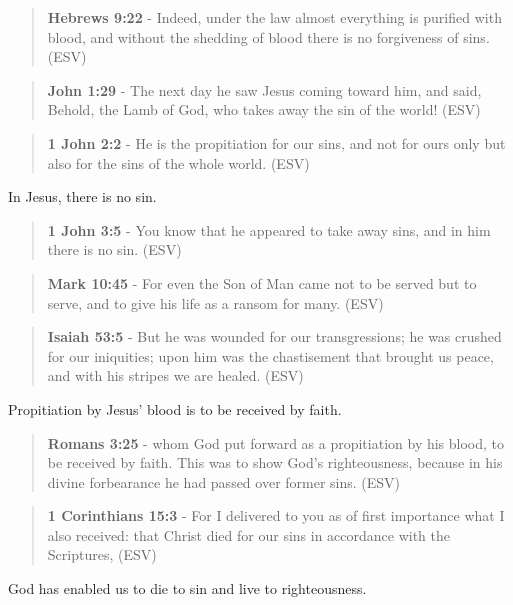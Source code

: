 \documentclass[11pt]{article}
\begin{document}
\begin{quote}
\textbf{Hebrews 9:22} - Indeed, under the law almost everything is purified with blood, and without the shedding of blood there is no forgiveness of sins.  (ESV)
\end{quote}

\begin{quote}
\textbf{John 1:29} - The next day he saw Jesus coming toward him, and said, Behold, the Lamb of God, who takes away the sin of the world!  (ESV)
\end{quote}

\begin{quote}
\textbf{1 John 2:2} - He is the propitiation for our sins, and not for ours only but also for the sins of the whole world.  (ESV)
\end{quote}

In Jesus, there is no sin.

\begin{quote}
\textbf{1 John 3:5} - You know that he appeared to take away sins, and in him there is no sin.  (ESV)
\end{quote}

\begin{quote}
\textbf{Mark 10:45} -  For even the Son of Man came not to be served but to serve, and to give his life as a ransom for many.  (ESV)
\end{quote}

\begin{quote}
\textbf{Isaiah 53:5} -  But he was wounded for our transgressions; he was crushed for our iniquities; upon him was the chastisement that brought us peace, and with his stripes we are healed.  (ESV)
\end{quote}

Propitiation by Jesus' blood is to be received by faith.

\begin{quote}
\textbf{Romans 3:25} -  whom God put forward as a propitiation by his blood, to be received by faith.  This was to show God's righteousness, because in his divine forbearance he had passed over former sins.  (ESV)
\end{quote}

\begin{quote}
\textbf{1 Corinthians 15:3} -  For I delivered to you as of first importance what I also received: that Christ died for our sins in accordance with the Scriptures,  (ESV)
\end{quote}

God has enabled us to die to sin and live to righteousness.
\end{document}
